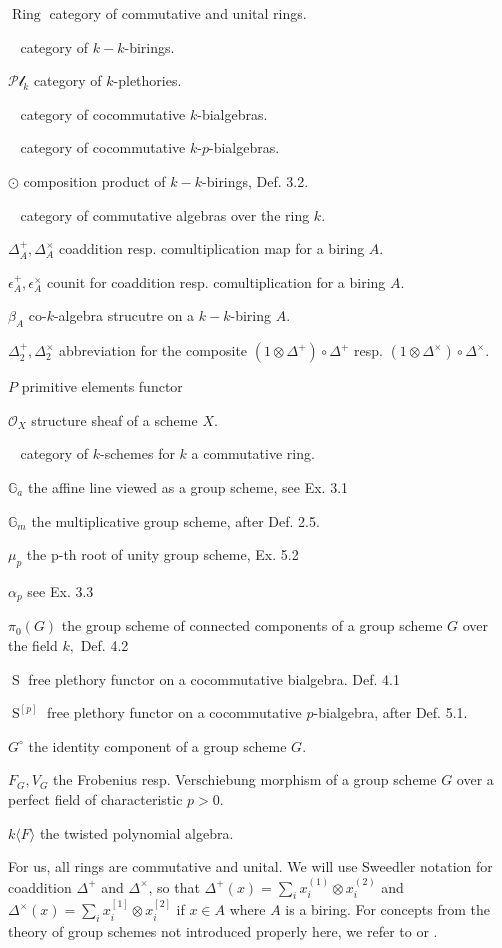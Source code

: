 \documentclass[a4paper, 12pt]{amsart}
\DeclareMathOperator{\Schk}{Sch_k}
\DeclareMathOperator{\Bialgk}{Bialg_k}
\DeclareMathOperator{\Algk}{Alg_k}
\DeclareMathOperator{\Bialgkp}{Bialg_k^p}
\DeclareMathOperator{\Sym}{S}
\DeclareMathOperator{\BR}{BR_{k,k}}
\newcommand{\Ring}{{\operatorname{Ring}}}
\numberwithin{equation}{section}
\theoremstyle{definition}
\begin{document}
\begin{list}{}{ 8ex \leftmargin 10ex  2ex \itemsep 2pt \parsep 0pt}
\item[{$\Ring$}] category of commutative and unital rings. 
\item[{$\BR$}] category of $k-k$-birings.
\item[{$\mathcal{Pl}_k$}] category of $k$-plethories. 
\item[{$\Bialgk$}] category of cocommutative $k$-bialgebras.
\item[{$\Bialgkp$}] category of cocommutative $k$-$p$-bialgebras.
\item[{$\odot$}] composition product of $k-k$-birings, Def.  3.2.
\item[{$\Algk$}] category of commutative algebras over the ring $k.$ 
\item[{$\Delta^+_A,\Delta^\times_A$}] coaddition resp. comultiplication map for a biring $A.$ 
\item[{$\epsilon^+_A,\epsilon^\times_A$}] counit for coaddition resp. comultiplication for a biring $A.$ 
\item[{$\beta_A$}] co-$k$-algebra strucutre on a $k-k$-biring $A.$ 
\item[{$\Delta_2^+, \Delta_2^\times$}] abbreviation for the composite $(1 \otimes \Delta^+)\circ \Delta^+$ resp. $(1 \otimes \Delta^\times) \circ \Delta^\times.$
\item[{$P$}] primitive elements functor 
\item[{$\mathcal{O}_X$}] structure sheaf of a scheme $X.$ 
\item[{$\Schk$}] category of $k$-schemes for $k$ a commutative ring. 
\item[{$\mathbb{G}_a$}] the affine line viewed as a group scheme, see Ex. 3.1
\item[{$\mathbb{G}_m$}] the multiplicative group scheme, after Def. 2.5.
\item[{$\mu_p$}] the p-th root of unity group scheme, Ex. 5.2
\item[{$\alpha_p$}] see Ex. 3.3
\item[{$\pi_0(G)$}] the group scheme of connected components of a group scheme $G$ over the field $k,$  Def. 4.2
\item[{$\Sym$}] free plethory functor on a cocommutative bialgebra. Def. 4.1
\item[{$\Sym^{[p]}$}] free plethory functor on a cocommutative $p$-bialgebra, after Def. 5.1.
\item[{$G^\circ$}] the identity component of a group scheme $G.$ 
\item[{$F_G,V_G$}] the Frobenius resp. Verschiebung morphism of a group scheme $G$ over a perfect field of characteristic $p>0.$ 
\item[{$k\langle F \rangle$}] the twisted polynomial algebra.
\end{list}
For us, all rings are commutative and unital. We will use Sweedler notation for coaddition $\Delta^+$ and $\Delta^\times$, so that $\Delta^+(x) = \sum_i  x_i^{(1)} \otimes x_i^{(2)}$ and $\Delta^\times(x) = \sum_i x_i^{[1]} \otimes x_i^{[2]}$  if $x \in A$ where $A$ is a biring. For concepts from the theory of group schemes not introduced properly here, we refer to \cite{MilneiAG} or \cite{DemazureG} .
\end{document}
